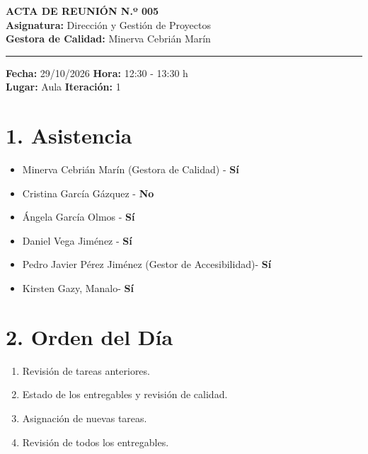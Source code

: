 
\begin{center}
    {\Large \textbf{ACTA DE REUNIÓN N.º 005}}\\[0.2cm]
    \textbf{Asignatura:} Dirección y Gestión de Proyectos\\
    \textbf{Gestora de Calidad:} Minerva Cebrián Marín
\end{center}

\vspace{0.3cm}
\hrule
\vspace{0.4cm}

\noindent \textbf{Fecha:} 29/10/2026 \hfill \textbf{Hora:} 12:30 - 13:30 h\\
\noindent \textbf{Lugar:} Aula  \hfill \textbf{Iteración:} 1

\vspace{0.4cm}

\section*{1. Asistencia}
\begin{itemize}
    \item Minerva Cebrián Marín (Gestora de Calidad) - \textbf{Sí}
    \item Cristina García Gázquez  - \textbf{No}
    \item Ángela García Olmos  - \textbf{Sí}
    \item Daniel Vega Jiménez - \textbf{Sí}
    \item Pedro Javier Pérez Jiménez (Gestor de Accesibilidad)- \textbf{Sí}
    \item Kirsten Gazy, Manalo- \textbf{Sí}

\end{itemize}



\section*{2. Orden del Día}
\begin{enumerate}
    \item Revisión de tareas anteriores.
    \item Estado de los entregables y revisión de calidad.
    \item Asignación de nuevas tareas.
    \item Revisión de todos los entregables.
\end{enumerate}

